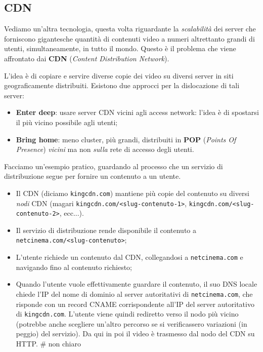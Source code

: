 \documentclass[a4paper,11pt]{article}
\begin{document}
\subsection{CDN}
Vediamo un'altra tecnologia, questa volta riguardante la \textit{scalabilità} dei server che forniscono gigantesche quantità di contenuti video a numeri altrettanto grandi di utenti, simultaneamente, in tutto il mondo.
Questo è il problema che viene affrontato dai \textbf{CDN} (\textit{Content Distribution Network}).

L'idea è di copiare e servire diverse copie dei video su diversi server in siti geograficamente distribuiti.
Esistono due approcci per la dislocazione di tali server:
\begin{itemize}
	\item \textbf{Enter deep}: usare server CDN vicini agli access network: l'idea è di spostarsi il più vicino possibile agli utenti;
	\item \textbf{Bring home}: meno cluster, più grandi, distribuiti in \textbf{POP} (\textit{Points Of Presence}) \textit{vicini} ma non \textit{sulla} rete di accesso degli utenti. 
\end{itemize}

Facciamo un'esempio pratico, guardando al processo che un servizio di distribuzione segue per fornire un contenuto a un utente.
\begin{itemize}
	\item Il CDN (diciamo \lstinline|kingcdn.com|) mantiene più copie del contenuto su diversi \textit{nodi} CDN (magari \lstinline|kingcdn.com/<slug-contenuto-1>|, \lstinline|kingcdn.com/<slug-contenuto-2>|, ecc...). 
	\item Il servizio di distribuzione rende disponibile il contenuto a \lstinline|netcinema.com/<slug-contenuto>|;
	\item L'utente richiede un contenuto dal CDN, collegandosi a \lstinline|netcinema.com| e navigando fino al contenuto richiesto;
	\item Quando l'utente vuole effettivamente guardare il contenuto, il suo DNS locale chiede l'IP del nome di dominio al server autoritativi di \lstinline|netcinema.com|, che risponde con un record CNAME corrispondente all'IP del server autoritativo di \lstinline|kingcdn.com|. L'utente viene quindi rediretto verso il nodo più vicino (potrebbe anche scegliere un'altro percorso se si verificassero variazioni (in peggio) del servizio). Da qui in poi il video è trasmesso dal nodo del CDN su HTTP. # non chiaro
\end{itemize}
\end{document}
